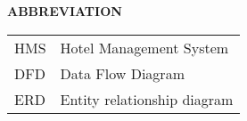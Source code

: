 \begin{center}
\Large \textbf{\uppercase{abbreviation}}

\vspace{1\baselineskip}
\begin{tabular}{l l}
HMS &\hspace{1cm} Hotel Management System\\
DFD &\hspace{1cm} Data Flow Diagram\\
ERD &\hspace{1cm} Entity relationship diagram 
\end{tabular}
\end{center}


